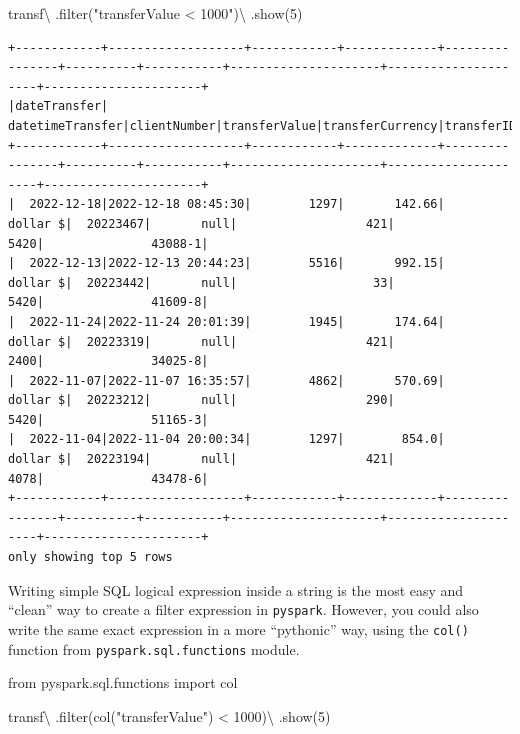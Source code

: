 \documentclass[
  11pt,
  letterpaper,
  DIV=11,
  numbers=noendperiod]{scrreprt}
\newenvironment{Shaded}{\begin{snugshade}}{\end{snugshade}}
\newcommand{\BuiltInTok}[1]{\textcolor[rgb]{0.00,0.23,0.31}{#1}}
\newcommand{\DecValTok}[1]{\textcolor[rgb]{0.68,0.00,0.00}{#1}}
\newcommand{\ImportTok}[1]{\textcolor[rgb]{0.00,0.46,0.62}{#1}}
\newcommand{\NormalTok}[1]{\textcolor[rgb]{0.00,0.23,0.31}{#1}}
\newcommand{\OperatorTok}[1]{\textcolor[rgb]{0.37,0.37,0.37}{#1}}
\newcommand{\StringTok}[1]{\textcolor[rgb]{0.13,0.47,0.30}{#1}}
\begin{document}
\begin{Shaded}
\begin{Highlighting}[]
\NormalTok{transf}\OperatorTok{\textbackslash{}}
\NormalTok{  .}\BuiltInTok{filter}\NormalTok{(}\StringTok{"transferValue \textless{} 1000"}\NormalTok{)}\OperatorTok{\textbackslash{}}
\NormalTok{  .show(}\DecValTok{5}\NormalTok{)}
\end{Highlighting}
\end{Shaded}

\begin{verbatim}
+------------+-------------------+------------+-------------+----------------+----------+-----------+---------------------+---------------------+----------------------+
|dateTransfer|   datetimeTransfer|clientNumber|transferValue|transferCurrency|transferID|transferLog|destinationBankNumber|destinationBankBranch|destinationBankAccount|
+------------+-------------------+------------+-------------+----------------+----------+-----------+---------------------+---------------------+----------------------+
|  2022-12-18|2022-12-18 08:45:30|        1297|       142.66|        dollar $|  20223467|       null|                  421|                 5420|               43088-1|
|  2022-12-13|2022-12-13 20:44:23|        5516|       992.15|        dollar $|  20223442|       null|                   33|                 5420|               41609-8|
|  2022-11-24|2022-11-24 20:01:39|        1945|       174.64|        dollar $|  20223319|       null|                  421|                 2400|               34025-8|
|  2022-11-07|2022-11-07 16:35:57|        4862|       570.69|        dollar $|  20223212|       null|                  290|                 5420|               51165-3|
|  2022-11-04|2022-11-04 20:00:34|        1297|        854.0|        dollar $|  20223194|       null|                  421|                 4078|               43478-6|
+------------+-------------------+------------+-------------+----------------+----------+-----------+---------------------+---------------------+----------------------+
only showing top 5 rows
\end{verbatim}

Writing simple SQL logical expression inside a string is the most easy
and ``clean'' way to create a filter expression in \texttt{pyspark}.
However, you could also write the same exact expression in a more
``pythonic'' way, using the \texttt{col()} function from
\texttt{pyspark.sql.functions} module.

\begin{Shaded}
\begin{Highlighting}[]
\ImportTok{from}\NormalTok{ pyspark.sql.functions }\ImportTok{import}\NormalTok{ col}

\NormalTok{transf}\OperatorTok{\textbackslash{}}
\NormalTok{  .}\BuiltInTok{filter}\NormalTok{(col(}\StringTok{"transferValue"}\NormalTok{) }\OperatorTok{\textless{}} \DecValTok{1000}\NormalTok{)}\OperatorTok{\textbackslash{}}
\NormalTok{  .show(}\DecValTok{5}\NormalTok{)}
\end{Highlighting}
\end{Shaded}
\end{document}
